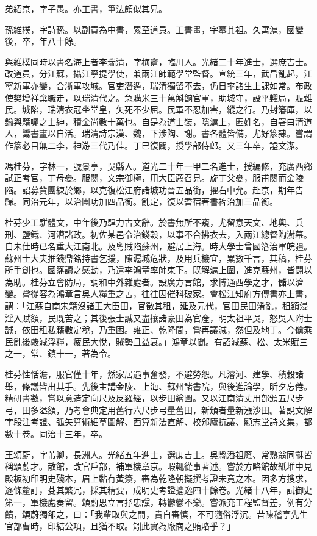 \begin{pinyinscope}
弟紹京，字子愚。亦工書，筆法頗似其兄。

孫維樸，字詩孫。以副貢為中書，累至道員。工書畫，字摹其祖。久寓滬，國變後，卒，年八十餘。

與維樸同時以書名海上者李瑞清，字梅盦，臨川人。光緒二十年進士，選庶吉士。改道員，分江蘇，攝江寧提學使，兼兩江師範學堂監督。宣統三年，武昌亂起，江寧新軍亦變，合浙軍攻城。官吏潛遁，瑞清獨留不去，仍日率諸生上課如常。布政使樊增祥棄職走，以瑞清代之。急購米三十萬斛餉官軍，助城守，設平糶局，賑難民。城陷，瑞清衣冠坐堂皇，矢死不少屈。民軍不忍加害，縱之行。乃封籓庫，以鑰與籍囑之士紳，積金尚數十萬也。自是為道士裝，隱滬上，匿姓名，自署曰清道人，鬻書畫以自活。瑞清詩宗漢、魏，下涉陶、謝。書各體皆備，尤好篆隸。嘗謂作篆必目無二李，神游三代乃佳。丁巳復闢，授學部侍郎。又三年卒，謚文潔。

馮桂芬，字林一，號景亭，吳縣人。道光二十年一甲二名進士，授編修，充廣西鄉試正考官，丁母憂。服闋，文宗御極，用大臣薦召見。旋丁父憂，服甫闋而金陵陷。詔募貲團練於鄉，以克復松江府諸城功晉五品銜，擢右中允。赴京，期年告歸。同治元年，以治團功加四品銜。亂定，復以耆宿著書裨治加三品銜。

桂芬少工駢體文，中年後乃肆力古文辭。於書無所不窺，尤留意天文、地輿、兵刑、鹽鐵、河漕諸政。初佐某邑令治錢穀，以事不合拂衣去，入兩江總督陶澍幕。自未仕時已名重大江南北。及粵賊陷蘇州，避居上海。時大學士曾國籓治軍皖疆。蘇州士大夫推錢鼎銘持書乞援，陳滬城危狀，及用兵機宜，累數千言，其稿，桂芬所手創也。國籓讀之感動，乃遣李鴻章率師東下。既解滬上圍，進克蘇州，皆闢以為助。桂芬立會防局，調和中外雜處者。設廣方言館，求博通西學之才，儲以濟變。嘗從容為鴻章言吳人糧重之苦，往往因催科破家。會松江知府方傳書亦上書，謂：「江蘇自南宋籍沒諸王大臣田，官徵其租，延及元代，官田民田淆亂，租額浸淫入賦額，民既苦之；其後張士誠又盡攘諸豪田為官產，明太祖平吳，怒吳人附士誠，依田租私籍數定稅，乃重困。雍正、乾隆間，嘗再議減，然但及地丁。今儻乘民亂後覈減浮糧，疲民大悅，賊勢且益衰。」鴻章以聞。有詔減蘇、松、太米賦三之一，常、鎮十一，著為令。

桂芬性恬澹，服官僅十年，然家居遇事奮發，不避勞怨。凡濬河、建學、積穀諸舉，條議皆出其手。先後主講金陵、上海、蘇州諸書院，與後進論學，昕夕忘倦。精研書數，嘗以意造定向尺及反羅經，以步田繪圖。又以江南清丈用部頒五尺步弓，田多溢額，乃考會典定用舊行六尺步弓量舊田，新頒者量新漲沙田。著說文解字段注考證、弧矢算術細草圖解、西算新法直解、校邠廬抗議、顯志堂詩文集，都數十卷。同治十三年，卒。

王頌蔚，字芾卿，長洲人。光緒五年進士，選庶吉士。吳縣潘祖廕、常熟翁同龢皆稱頌蔚才。散館，改官戶部，補軍機章京。暇輒從事著述。嘗於方略館故紙堆中見殿板初印明史殘本，眉上黏有黃簽，審為乾隆朝擬撰考證未竟之本。因多方搜求，逐條釐訂，芟其繁冗，採其精要，成明史考證攟逸四十餘卷。光緒十八年，試御史第一，軍機處奏留。頌蔚思立言抒忠讜，轉鬱鬱不樂。嘗派充工程監督差，例有分饋，頌蔚獨卻之，曰：「我輩取與之間，貴自審慎，不可隨俗浮沉。昔陳稽亭先生官部曹時，印結公項，且猶不取。矧此實為廠商之賄賂乎？」


\end{pinyinscope}
